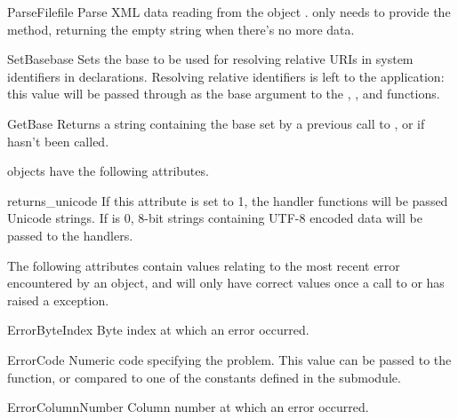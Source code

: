 \begin{methoddesc}{ParseFile}{file}
Parse XML data reading from the object .   only
needs to provide the  method, returning the
empty string when there's no more data.
\end{methoddesc}

\begin{methoddesc}{SetBase}{base}
Sets the base to be used for resolving relative URIs in system identifiers in
declarations.  Resolving relative identifiers is left to the application:
this value will be passed through as the base argument to the
, ,
and  functions. 
\end{methoddesc}

\begin{methoddesc}{GetBase}{}
Returns a string containing the base set by a previous call to
, or  if 
 hasn't been called.
\end{methoddesc}

 objects have the following attributes.  

\begin{datadesc}{returns_unicode} 
If this attribute is set to 1, the handler functions will be passed
Unicode strings.  If  is 0, 8-bit strings
containing UTF-8 encoded data will be passed to the handlers.
\end{datadesc} 

The following attributes contain values relating to the most recent
error encountered by an  object, and will only have
correct values once a call to  or 
has raised a  exception.

\begin{datadesc}{ErrorByteIndex} 
Byte index at which an error occurred.
\end{datadesc} 

\begin{datadesc}{ErrorCode} 
Numeric code specifying the problem.  This value can be passed to the
 function, or compared to one of the constants
defined in the  submodule.
\end{datadesc}

\begin{datadesc}{ErrorColumnNumber} 
Column number at which an error occurred.
\end{datadesc}

